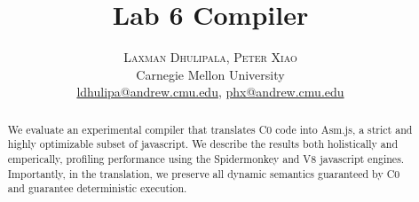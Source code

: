 \documentclass[twoside]{article}
\title{\vspace{-15mm}\fontsize{20pt}{10pt}\selectfont\textbf{Lab 6 Compiler}} %
\author{
\large
\textsc{Laxman Dhulipala, Peter Xiao}\\[2mm] %
\normalsize Carnegie Mellon University \\ %
\normalsize \href{mailto:ldhulipa@andrew.cmu.edu}{ldhulipa@andrew.cmu.edu}, \href{mailto:phx@andrew.cmu.edu}{phx@andrew.cmu.edu} %
\vspace{-5mm}
}
\date{}
\begin{document}
\maketitle %

\thispagestyle{fancy} %


\begin{abstract}

\noindent We evaluate an experimental compiler that translates C0 code into Asm.js, a strict
and highly optimizable subset of javascript. We describe the results both holistically and emperically,
profiling performance using the Spidermonkey and V8 javascript engines. Importantly, in the
translation, we preserve all dynamic semantics guaranteed by C0 and guarantee deterministic execution.

\end{abstract}

\end{document}
